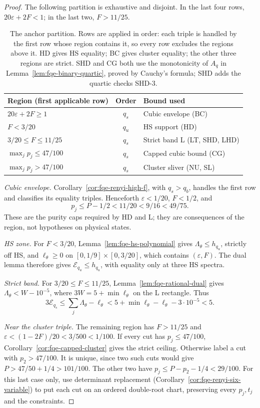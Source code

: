 \begin{proof}
The following partition is exhaustive and disjoint. In the last four rows,
$20\varepsilon+2F<1$; in the last two, $F>11/25$.
\begin{table}[htbp]
\centering\small
\begin{tabular}{@{}p{.36\linewidth}cl@{}}
\toprule
Region (first applicable row) & Order & Bound used \\
\midrule
$20\varepsilon+2F\ge1$ & $q_s$ & Cubic envelope (BC) \\
$F<3/20$ & $q_u$ & HS support (HD) \\
$3/20\le F\le11/25$ & $q_s$ & Strict band L (LT, SHD, LHD) \\
$\max_jp_j\le47/100$ & $q_s$ & Capped cubic bound (CG) \\
$\max_jp_j>47/100$ & $q_s$ & Cluster sliver (NU, SL) \\
\bottomrule
\end{tabular}
\caption{The anchor partition. Rows are applied in order: each triple is handled by the first row whose region
contains it, so every row excludes the regions above it. HD gives HS equality; BC gives cluster equality; the other
three regions are strict. SHD and CG both use the monotonicity of $A_q$ in Lemma~\ref{lem:fqe-binary-quartic}, proved by Cauchy's formula;
SHD adds the quartic checks SHD-3.}
\label{tab:fqe-renyi-coverage}
\end{table}

\emph{Cubic envelope.} Corollary~\ref{cor:fqe-renyi-high-f}, with $q_s>q_b$,
handles the first row and classifies its equality triples.
Henceforth $\varepsilon<1/20$, $F<1/2$, and
\[
 p_j\le P-1/2<11/20<9/16<49/75.
\]
These are the purity caps required by HD and L; they are consequences of
the region, not hypotheses on physical states.

\emph{HS zone.} For $F<3/20$, Lemma~\ref{lem:fqe-hs-polynomial} gives
$\Lambda_\theta\le h_{q_u}$, strictly off HS, and
$\ell_\theta\ge0$ on $[0,1/9]\times[0,3/20]$, which contains $(\varepsilon,F)$.
The dual lemma therefore gives $\mathcal E_{q_u}\le h_{q_u}$,
with equality only at three HS spectra.

\emph{Strict band.} For $3/20\le F\le11/25$,
Lemma~\ref{lem:fqe-rational-dual} gives
$\Lambda_\theta<W-10^{-5}$, where $3W=5+\min\ell_\theta$ on the
L rectangle. Thus
\[
 3\mathcal E_{q_s}\le\sum_j\Lambda_\theta-\ell_\theta
 <5+\min\ell_\theta-\ell_\theta-3\cdot10^{-5}<5.
\]

\emph{Near the cluster triple.} The remaining region has $F>11/25$ and
$\varepsilon<(1-2F)/20<3/500<1/100$.
If every cut has $p_j\le47/100$, Corollary~\ref{cor:fqe-capped-cluster}
gives the strict ceiling. Otherwise label a cut with $p_2>47/100$.
It is unique, since two such cuts would give
$P>47/50+1/4>101/100$. The other two have
$p_j\le P-p_2-1/4<29/100$.
For this last case only, use determinant replacement
(Corollary~\ref{cor:fqe-renyi-six-variable}) to put each cut on an ordered
double-root chart, preserving every $p_j,t_j$ and the constraints.


\end{proof}
